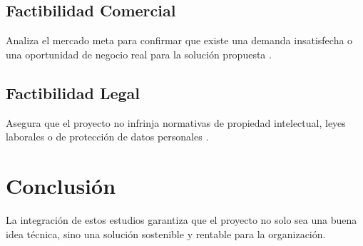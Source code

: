\documentclass[12pt, letterpaper]{article}
\begin{document}
\subsection{Factibilidad Comercial}
Analiza el mercado meta para confirmar que existe una demanda insatisfecha o una oportunidad de negocio real para la solución propuesta \cite{baca2013}.

\subsection{Factibilidad Legal}
Asegura que el proyecto no infrinja normativas de propiedad intelectual, leyes laborales o de protección de datos personales \cite{sapag2011}.

\section{Conclusión}
La integración de estos estudios garantiza que el proyecto no solo sea una buena idea técnica, sino una solución sostenible y rentable para la organización.


\newpage

\end{document}
